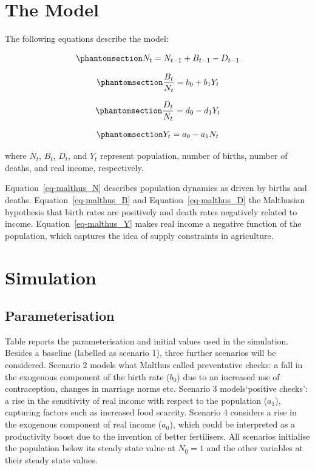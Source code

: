 \documentclass[
  letterpaper,
  DIV=11,
  numbers=noendperiod]{scrreprt}
\begin{document}
\section{The Model}\label{the-model-9}

The following equations describe the model:

\begin{equation}\phantomsection\label{eq-malthus_N}{
N_t = N_{t-1} + B_{t-1} - D_{t-1} 
}\end{equation}

\begin{equation}\phantomsection\label{eq-malthus_B}{
\frac{B_{t}}{N_t} = b_0 + b_1Y_t 
}\end{equation}

\begin{equation}\phantomsection\label{eq-malthus_D}{
\frac{D_{t}}{N_t} = d_0 - d_1Y_t 
}\end{equation}

\begin{equation}\phantomsection\label{eq-malthus_Y}{
Y_t = a_0-a_1N_t 
}\end{equation}

where \(N_t\), \(B_t\), \(D_t\), and \(Y_t\) represent population,
number of births, number of deaths, and real income, respectively.

Equation~\ref{eq-malthus_N} describes population dynamics as driven by
births and deaths. Equation~\ref{eq-malthus_B} and
Equation~\ref{eq-malthus_D} the Malthusian hypothesis that birth rates
are positively and death rates negatively related to income.
Equation~\ref{eq-malthus_Y} makes real income a negative function of the
population, which captures the idea of supply constraints in
agriculture.

\section{Simulation}\label{simulation-9}

\subsection{Parameterisation}\label{parameterisation-9}

Table reports the parameterisation and initial values used in the
simulation. Besides a baseline (labelled as scenario 1), three further
scenarios will be considered. Scenario 2 models what Malthus called
preventative checks: a fall in the exogenous component of the birth rate
(\(b_0\)) due to an increased use of contraception, changes in marriage
norms etc. Scenario 3 models`positive checks': a rise in the sensitivity
of real income with respect to the population (\(a_1\)), capturing
factors such as increased food scarcity. Scenario 4 considers a rise in
the exogenous component of real income (\(a_0\)), which could be
interpreted as a productivity boost due to the invention of better
fertilisers. All scenarios initialise the population below its steady
state value at \(N_0=1\) and the other variables at their steady state
values.
\end{document}

